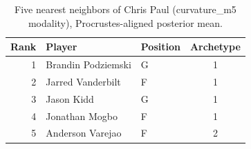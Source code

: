 \begin{table}[htbp]
  \centering\small
  \begin{tabular}{rllc}
    \toprule
    Rank & Player & Position & Archetype \\
    \midrule
    1 & Brandin Podziemski & G & 1 \\
    2 & Jarred Vanderbilt & F & 1 \\
    3 & Jason Kidd & G & 1 \\
    4 & Jonathan Mogbo & F & 1 \\
    5 & Anderson Varejao & F & 2 \\
    \bottomrule
  \end{tabular}
  \caption{Five nearest neighbors of Chris Paul (curvature_m5 modality), Procrustes-aligned posterior mean.}
  \label{tab:Chris_Paul_neighbors_curvature_m5}
\end{table}

